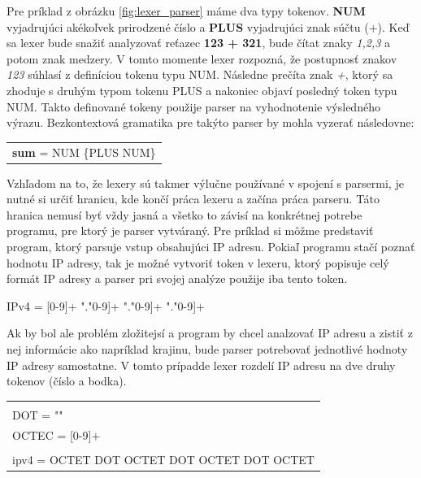 Pre príklad z obrázku \ref{fig:lexer_parser}  máme dva typy tokenov. \textbf{NUM} vyjadrujúci akékoľvek prirodzené číslo a \textbf{PLUS} vyjadrujúci znak súčtu (+). Keď sa lexer bude snažiť analyzovať reťazec \textbf{123 + 321}, bude čítat znaky \textit{1,2,3} a potom znak medzery. V tomto momente lexer rozpozná, že postupnosť znakov \textit{123} súhlasí z definíciou tokenu typu NUM. Následne prečíta znak \textit{+}, ktorý sa zhoduje s druhým typom tokenu PLUS a nakoniec objaví posledný token typu NUM. Takto definované tokeny použije parser na vyhodnotenie výsledného výrazu. Bezkontextová gramatika pre takýto parser by mohla vyzerať následovne:

\begin{center}
\begin{tabular}{p{}}
\textbf{sum} = NUM \{PLUS NUM\}
\end{tabular}
\end{center}

Vzhľadom na to, že lexery sú takmer výlučne používané v spojení s parsermi, je nutné si určiť hranicu, kde končí práca lexeru a začína práca parseru. Táto hranica nemusí byť vždy jasná a všetko to závisí na konkrétnej potrebe programu, pre ktorý je parser vytváraný. Pre príklad si môžme predstaviť program, ktorý parsuje vstup obsahujúci IP adresu. Pokiaľ programu stačí poznať hodnotu IP adresy, tak je možné vytvoriť token v lexeru, ktorý popisuje celý formát IP adresy a parser pri svojej analýze použije iba tento token. 
\begin{center}
IPv4 = [0-9]+ "."\text{ [}0-9]+ "."\text{ [}0-9]+ "."\text{ [}0-9]+
\end{center}

Ak by bol ale problém zložitejsí a program by chcel analzovať IP adresu a zistiť z nej informácie ako napríklad krajinu, bude parser potrebovať jednotlivé hodnoty IP adresy samostatne. V tomto prípadde lexer rozdelí IP adresu na dve druhy tokenov (číslo a bodka).

\begin{center}
\begin{tabular}{p{}}
\color{editorGray}{/* Lexer */}\\
DOT   = "\text{.}"\\
OCTEC = [0-9]+\\
\color{editorGray}{/* Parser */}\\
ipv4  = OCTET DOT OCTET DOT OCTET DOT OCTET
\end{tabular}
\end{center}

